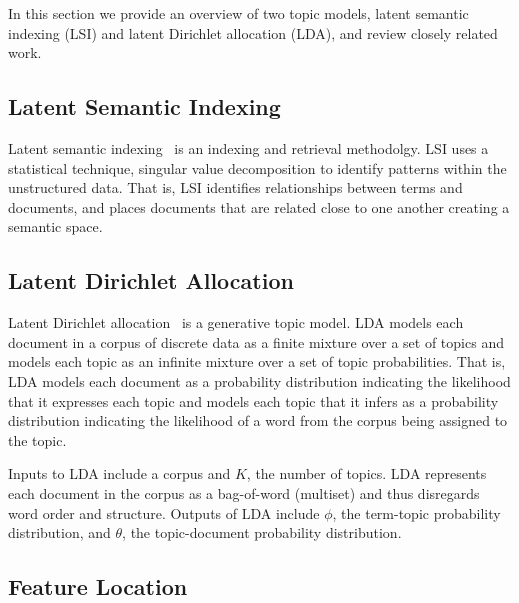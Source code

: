 
In this section we provide an overview of two topic models,
latent semantic indexing (LSI) and latent Dirichlet allocation (LDA),
and review closely related work.

\subsection{Latent Semantic Indexing}

Latent semantic indexing~\cite{Deerwester:1990} is an indexing and 
retrieval methodolgy. LSI uses a statistical technique, singular value 
decomposition to identify patterns within the unstructured data. That is, 
LSI identifies relationships between terms and documents, and places 
documents that are related close to one another creating a semantic space. 


\subsection{Latent Dirichlet Allocation}

Latent Dirichlet allocation~\cite{Blei-etal:2003} is a generative topic model.
LDA models each document in a corpus of discrete data as a finite mixture over a set of topics
and models each topic as an infinite mixture over a set of topic probabilities.
That is, LDA models each document as a probability distribution
indicating the likelihood that it expresses each topic and
models each topic that it infers as a probability distribution
indicating the likelihood of a word from the corpus being assigned to the topic.

Inputs to LDA include a corpus and $K$, the number of topics.
LDA represents each document in the corpus as a bag-of-word (multiset)
and thus disregards word order and structure.
Outputs of LDA include $\phi$, the term-topic probability distribution,
and $\theta$, the topic-document probability distribution.


\subsection{Feature Location}

